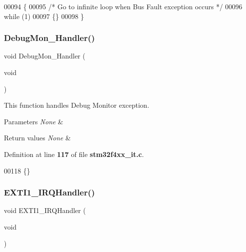 \begin{DoxyCode}
00094 \{
00095   \textcolor{comment}{/* Go to infinite loop when Bus Fault exception occurs */}
00096   \textcolor{keywordflow}{while} (1)
00097   \{\}
00098 \}
\end{DoxyCode}
\mbox{\label{group__TIM__PWM__Input_gadbdfb05858cc36fc520974df37ec3cb0}} 
\subsubsection{Debug\+Mon\+\_\+\+Handler()}
{\footnotesize\ttfamily void Debug\+Mon\+\_\+\+Handler (\begin{DoxyParamCaption}\item[{void}]{ }\end{DoxyParamCaption})}



This function handles Debug Monitor exception. 


\begin{DoxyParams}{Parameters}
{\em None} & \\
\hline
\end{DoxyParams}

\begin{DoxyRetVals}{Return values}
{\em None} & \\
\hline
\end{DoxyRetVals}


Definition at line \textbf{ 117} of file \textbf{ stm32f4xx\+\_\+it.\+c}.


\begin{DoxyCode}
00118 \{\}
\end{DoxyCode}
\mbox{\label{group__TIM__PWM__Input_ga49cfdd46eb8d0ef3e1987514aa9343dc}} 
\subsubsection{E\+X\+T\+I1\+\_\+\+I\+R\+Q\+Handler()}
{\footnotesize\ttfamily void E\+X\+T\+I1\+\_\+\+I\+R\+Q\+Handler (\begin{DoxyParamCaption}\item[{void}]{ }\end{DoxyParamCaption})}



